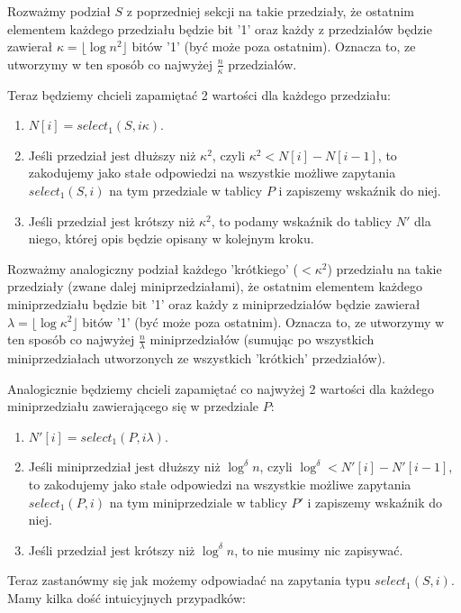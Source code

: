\documentclass{article}
\begin{document}
Rozważmy podział $S$ z poprzedniej sekcji na takie przedziały, że ostatnim elementem każdego przedziału będzie bit '1' oraz każdy z przedziałów będzie zawierał $\kappa = \lfloor \log{n}^2 \rfloor$ bitów '1' (być może poza ostatnim). Oznacza to, ze utworzymy w ten sposób co najwyżej $\frac{n}{\kappa}$ przedziałów.

Teraz będziemy chcieli zapamiętać 2 wartości dla każdego przedziału:
\begin{enumerate}
    \item $N[i] = select_1(S, i\kappa)$.
    \item Jeśli przedział jest dłuższy niż $\kappa^2$, czyli $\kappa^2 < N[i] - N[i-1]$, to zakodujemy jako stałe odpowiedzi na wszystkie możliwe zapytania $select_1(S, i)$ na tym przedziale w tablicy $P$ i zapiszemy wskaźnik do niej.
    \item Jeśli przedział jest krótszy niż $\kappa^2$, to podamy wskaźnik do tablicy $N'$ dla niego, której opis będzie opisany w kolejnym kroku.
\end{enumerate}

Rozważmy analogiczny podział każdego 'krótkiego' ($< \kappa^2$) przedziału na takie przedziały (zwane dalej miniprzedziałami), że ostatnim elementem każdego miniprzedziału będzie bit '1' oraz każdy z miniprzedziałów będzie zawierał $\lambda = \lfloor \log{\kappa}^2 \rfloor$ bitów '1' (być może poza ostatnim). Oznacza to, ze utworzymy w ten sposób co najwyżej $\frac{n}{\lambda}$ miniprzedziałów (sumując po wszystkich miniprzedziałach utworzonych ze wszystkich 'krótkich' przedziałów).

Analogicznie będziemy chcieli zapamiętać co najwyżej 2 wartości dla każdego miniprzedziału zawierającego się w przedziale $P$:
\begin{enumerate}
    \item $N'[i] = select_1(P, i\lambda)$.
    \item Jeśli miniprzedział jest dłuższy niż $\log^{\delta}{n}$, czyli $\log^{\delta} < N'[i] - N'[i-1]$, to zakodujemy jako stałe odpowiedzi na wszystkie możliwe zapytania $select_1(P, i)$ na tym miniprzedziale w tablicy $P'$ i zapiszemy wskaźnik do niej.
    \item Jeśli przedział jest krótszy niż $\log^{\delta}{n}$, to nie musimy nic zapisywać.
\end{enumerate}

Teraz zastanówmy się jak możemy odpowiadać na zapytania typu $select_1(S, i)$. Mamy kilka dość intuicyjnych przypadków:
\end{document}
